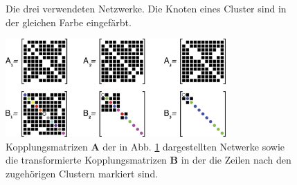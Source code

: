 \begin{figure}
	 \centering
	 \caption[In der Simulation verwendete Netzwerke]{Die drei verwendeten Netzwerke. Die Knoten eines Cluster sind in der gleichen Farbe eingefärbt.}
	 \label{fig:cluster}
	 
\end{figure}

\begin{figure}
	\centering
	\includegraphics[width=0.75\textwidth]{abb/misc/ABMat.png}
	\caption{Kopplungsmatrizen $\boldsymbol{A}$ der in Abb. \ref{fig:cluster} dargestellten Netwerke sowie die transformierte Kopplungsmatrizen $\boldsymbol{B}$ in der die Zeilen nach den zugehörigen Clustern markiert sind\cite{pecora2014}.}
\label{fig:abmat}
\end{figure}

